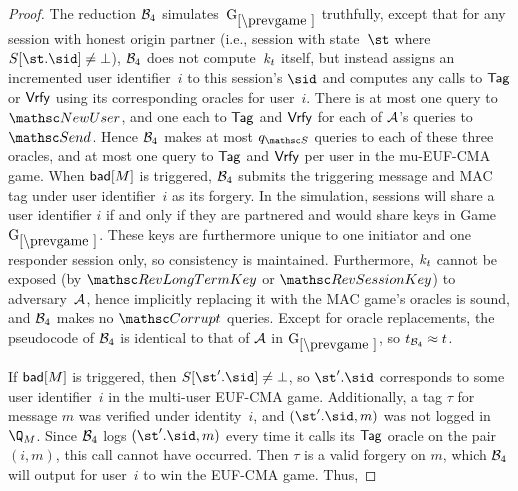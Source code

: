 \begin{proof}
The reduction $\mathcal{B}_4$ simulates~$\prevGm$ truthfully, except that for any session with honest origin partner (i.e., session with state~$\st$ where $\S[\st.\sid] \neq \bot$), $\mathcal{B}_4$ does not compute~$k_t$ itself, but instead assigns an incremented user identifier~$i$ to this session's $\sid$ and computes any calls to $\mathsf{Tag}$ or $\mathsf{Vrfy}$ using its corresponding oracles for user~$i$.
There is at most one query to $\NewUser$, and one each to $\mathsf{Tag}$ and $\mathsf{Vrfy}$ for each of $\mathcal{A}$'s queries to $\Send$. Hence $\mathcal{B}_4$ makes at most $\qSend$ queries to each of these three oracles, and at most one query to $\mathsf{Tag}$ and $\mathsf{Vrfy}$ per user in the mu-EUF-CMA game.
When $\mathsf{bad}[M]$ is triggered, $\mathcal{B}_4$ submits the triggering message and MAC tag under user identifier~$i$ as its forgery.
In the simulation, sessions will share a user identifier $i$ if and only if they are partnered and would share keys in Game~$\prevGm$.
These keys are furthermore unique to one initiator and one responder session only, so consistency is maintained.
Furthermore, $k_t$ cannot be exposed (by $\RevLongTermKey$ or $\RevSessionKey$) to adversary~$\mathcal{A}$, hence implicitly replacing it with the MAC game's oracles is sound, and $\mathcal{B}_4$ makes no $\Corrupt$ queries. 
Except for oracle replacements, the pseudocode of $\mathcal{B}_4$ is identical to that of $\mathcal{A}$ in $\prevGm*$, so $t_{\mathcal{B}_4}\approx t$.

If $\mathsf{bad}[M]$ is triggered, then $S[\st'.\sid]\neq \bot$, so $\st'.\sid$ corresponds to some user identifier~$i$ in the multi-user EUF-CMA game.
Additionally, a tag $\tau$ for message $m$ was verified under identity~$i$, and $(\st'.\sid,m)$ was not logged in $\Q_M$. Since $\mathcal{B}_4$ logs $(\st'.\sid,m)$ every time it calls its $\mathsf{Tag}$ oracle on the pair $(i,m)$, this call cannot have occurred.
Then $\tau$ is a valid forgery on $m$, which $\mathcal{B}_4$ will output for user~$i$ to win the EUF-CMA game.
Thus,

\medskip


\end{proof}
